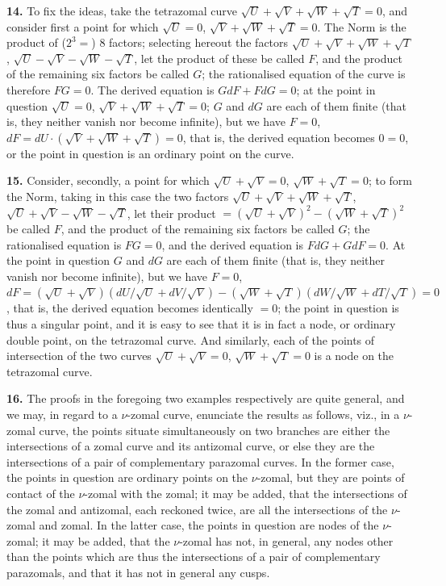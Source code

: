 \documentclass[11pt,a4paper]{article}
\theoremstyle{definition}
\begin{document}
\noindent\textbf{14.} To fix the ideas, take the tetrazomal curve $\sqrt{U}+\sqrt{V}+\sqrt{W}+\sqrt{T}=0$, and consider first a point for which $\sqrt{U}=0$, $\sqrt{V}+\sqrt{W}+\sqrt{T}=0$. The Norm is the product of ($2^3=$) 8 factors; selecting hereout the factors $\sqrt{U}+\sqrt{V}+\sqrt{W}+\sqrt{T}$, $\sqrt{U}-\sqrt{V}-\sqrt{W}-\sqrt{T}$, let the product of these be called $F$, and the product of the remaining six factors be called $G$; the rationalised equation of the curve is therefore $FG=0$. The derived equation is $GdF+FdG=0$; at the point in question $\sqrt{U}=0$, $\sqrt{V}+\sqrt{W}+\sqrt{T}=0$; $G$ and $dG$ are each of them finite (that is, they neither vanish nor become infinite), but we have $F=0$, $dF=dU\cdot(\sqrt{V}+\sqrt{W}+\sqrt{T})=0$, that is, the derived equation becomes $0=0$, or the point in question is an ordinary point on the curve.

\setcounter{page}{478}

\noindent\textbf{15.} Consider, secondly, a point for which $\sqrt{U}+\sqrt{V}=0$, $\sqrt{W}+\sqrt{T}=0$; to form the Norm, taking in this case the two factors $\sqrt{U}+\sqrt{V}+\sqrt{W}+\sqrt{T}$, $\sqrt{U}+\sqrt{V}-\sqrt{W}-\sqrt{T}$, let their product $=(\sqrt{U}+\sqrt{V})^2-(\sqrt{W}+\sqrt{T})^2$ be called $F$, and the product of the remaining six factors be called $G$; the rationalised equation is $FG=0$, and the derived equation is $FdG+GdF=0$. At the point in question $G$ and $dG$ are each of them finite (that is, they neither vanish nor become infinite), but we have $F=0$, $dF=(\sqrt{U}+\sqrt{V})(dU/\sqrt{U}+dV/\sqrt{V})-(\sqrt{W}+\sqrt{T})(dW/\sqrt{W}+dT/\sqrt{T})=0$, that is, the derived equation becomes identically $=0$; the point in question is thus a singular point, and it is easy to see that it is in fact a node, or ordinary double point, on the tetrazomal curve. And similarly, each of the points of intersection of the two curves $\sqrt{U}+\sqrt{V}=0$, $\sqrt{W}+\sqrt{T}=0$ is a node on the tetrazomal curve.

\noindent\textbf{16.} The proofs in the foregoing two examples respectively are quite general, and we may, in regard to a $\nu$-zomal curve, enunciate the results as follows, viz., in a $\nu$-zomal curve, the points situate simultaneously on two branches are either the intersections of a zomal curve and its antizomal curve, or else they are the intersections of a pair of complementary parazomal curves. In the former case, the points in question are ordinary points on the $\nu$-zomal, but they are points of contact of the $\nu$-zomal with the zomal; it may be added, that the intersections of the zomal and antizomal, each reckoned twice, are all the intersections of the $\nu$-zomal and zomal. In the latter case, the points in question are nodes of the $\nu$-zomal; it may be added, that the $\nu$-zomal has not, in general, any nodes other than the points which are thus the intersections of a pair of complementary parazomals, and that it has not in general any cusps.
\end{document}
